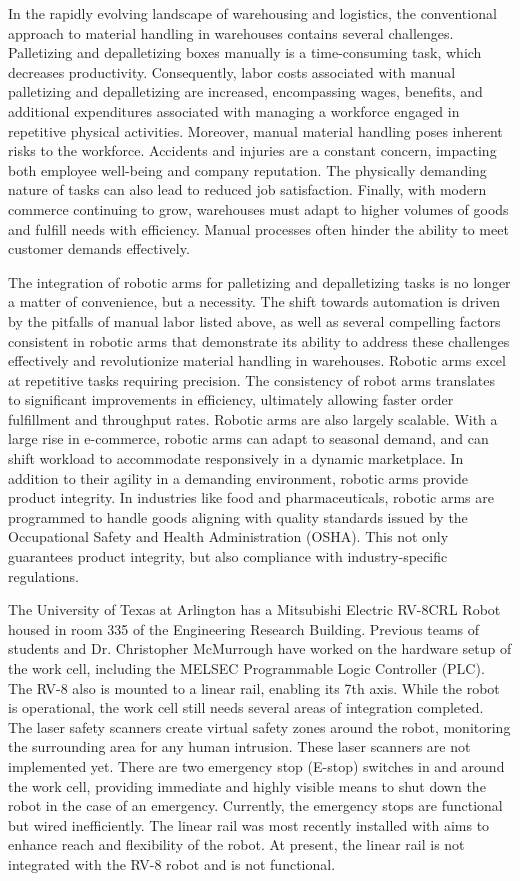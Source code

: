 In the rapidly evolving landscape of warehousing and logistics, the conventional approach to material handling in warehouses contains several challenges. Palletizing and depalletizing boxes manually is a time-consuming task, which decreases productivity. Consequently, labor costs associated with manual palletizing and depalletizing are increased, encompassing wages, benefits, and additional expenditures associated with managing a workforce engaged in repetitive physical activities. Moreover, manual material handling poses inherent risks to the workforce. Accidents and injuries are a constant concern, impacting both employee well-being and company reputation. The physically demanding nature of tasks can also lead to reduced job satisfaction. Finally, with modern commerce continuing to grow, warehouses must adapt to higher volumes of goods and fulfill needs with efficiency. Manual processes often hinder the ability to meet customer demands effectively.

The integration of robotic arms for palletizing and depalletizing tasks is no longer a matter of convenience, but a necessity. The shift towards automation is driven by the pitfalls of manual labor listed above, as well as several compelling factors consistent in robotic arms that demonstrate its ability to address these challenges effectively and revolutionize material handling in warehouses. Robotic arms excel at repetitive tasks requiring precision. The consistency of robot arms translates to significant improvements in efficiency, ultimately allowing faster order fulfillment and throughput rates. Robotic arms are also largely scalable. With a large rise in e-commerce, robotic arms can adapt to seasonal demand, and can shift workload to accommodate responsively in a dynamic marketplace. In addition to their agility in a demanding environment, robotic arms provide product integrity. In industries like food and pharmaceuticals, robotic arms are programmed to handle goods aligning with quality standards issued by the Occupational Safety and Health Administration (OSHA). This not only guarantees product integrity, but also compliance with industry-specific regulations.

The University of Texas at Arlington has a Mitsubishi Electric RV-8CRL Robot housed in room 335 of the Engineering Research Building. Previous teams of students and Dr. Christopher McMurrough have worked on the hardware setup of the work cell, including the MELSEC Programmable Logic Controller (PLC). The RV-8 also is mounted to a linear rail, enabling its 7th axis. While the robot is operational, the work cell still needs several areas of integration completed. The laser safety scanners create virtual safety zones around the robot, monitoring the surrounding area for any human intrusion. These laser scanners are not implemented yet. There are two emergency stop (E-stop) switches in and around the work cell, providing immediate and highly visible means to shut down the robot in the case of an emergency. Currently, the emergency stops are functional but wired inefficiently. The linear rail was most recently installed with aims to enhance reach and flexibility of the robot. At present, the linear rail is not integrated with the RV-8 robot and is not functional.

